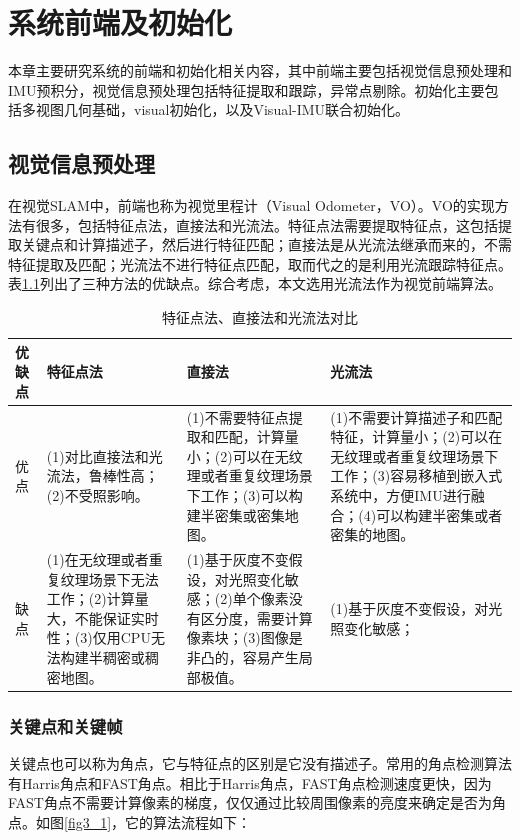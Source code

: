 \chapter{系统前端及初始化}
\label{chap:3}
本章主要研究系统的前端和初始化相关内容，其中前端主要包括视觉信息预处理和IMU预积分，视觉信息预处理包括特征提取和跟踪，异常点剔除。初始化主要包括多视图几何基础，visual初始化，以及Visual-IMU联合初始化。
\section{视觉信息预处理}
在视觉SLAM中，前端也称为视觉里程计（Visual Odometer，VO）。VO的实现方法有很多，包括特征点法，直接法和光流法。特征点法需要提取特征点，这包括提取关键点和计算描述子，然后进行特征匹配；直接法是从光流法继承而来的，不需特征提取及匹配；光流法不进行特征点匹配，取而代之的是利用光流跟踪特征点。表\ref{tab:3.1}列出了三种方法的优缺点。综合考虑，本文选用光流法作为视觉前端算法。
\begin{table}[h]\setlength{\abovecaptionskip}{6pt} 
	\centering
	\caption{特征点法、直接法和光流法对比} \label{tab:3.1}
	\begin{tabular}{m{}<{\centering} m{}<{\centering}  m{}<{\centering} m{}<{\centering} }%
		\toprule
		优缺点	   &   特征点法   &  	直接法	  &   光流法 \\
		\midrule
		优点	   &(1)对比直接法和光流法，鲁棒性高；(2)不受照影响。&(1)不需要特征点提取和匹配，计算量小；(2)可以在无纹理或者重复纹理场景下工作；(3)可以构建半密集或密集地图。 &(1)不需要计算描述子和匹配特征，计算量小；(2)可以在无纹理或者重复纹理场景下工作；(3)容易移植到嵌入式系统中，方便IMU进行融合；(4)可以构建半密集或者密集的地图。 \\
		缺点 &(1)在无纹理或者重复纹理场景下无法工作；(2)计算量大，不能保证实时性；(3)仅用CPU无法构建半稠密或稠密地图。  &(1)基于灰度不变假设，对光照变化敏感；(2)单个像素没有区分度，需要计算像素块；(3)图像是非凸的，容易产生局部极值。&(1)基于灰度不变假设，对光照变化敏感；\\	
		\bottomrule
	\end{tabular}
\end{table} 

\subsection{关键点和关键帧}
关键点也可以称为角点，它与特征点的区别是它没有描述子。常用的角点检测算法有Harris角点和FAST角点。相比于Harris角点，FAST角点检测速度更快，因为FAST角点不需要计算像素的梯度，仅仅通过比较周围像素的亮度来确定是否为角点。如图\ref{fig3_1}，它的算法流程如下：

